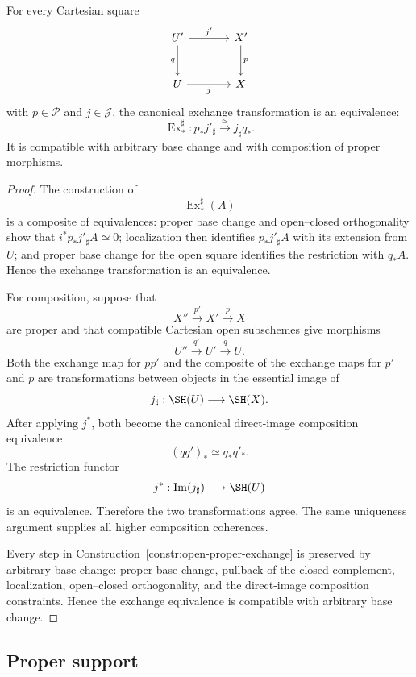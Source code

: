 \begin{theorem}
\label{thm:open-proper-exchange}
For every Cartesian square
\[
\begin{tikzcd}[column sep=large,row sep=large]
    U' \arrow[r,"j'"] \arrow[d,"q"']
        & X' \arrow[d,"p"] \\
    U \arrow[r,"j"']
        & X
\end{tikzcd}
\]
with \(p\in\mathcal P\) and \(j\in\mathcal J\), the canonical exchange
transformation is an equivalence:
\[
    \operatorname{Ex}^{\sharp}_{*}:
    p_*j'_\sharp
    \xrightarrow{\simeq}
    j_\sharp q_*.
\]
It is compatible with arbitrary base change and with composition of proper
morphisms.
\end{theorem}

\begin{proof}
The construction of
\[
    \operatorname{Ex}^{\sharp}_{*}(A)
\]
is a composite of equivalences: proper base change and open--closed
orthogonality show that \(i^*p_*j'_\sharp A\simeq0\); localization then
identifies \(p_*j'_\sharp A\) with its extension from \(U\); and proper base
change for the open square identifies the restriction with \(q_*A\).
Hence the exchange transformation is an equivalence.

For composition, suppose that
\[
    X''\xrightarrow{p'}X'\xrightarrow{p}X
\]
are proper and that compatible Cartesian open subschemes give morphisms
\[
    U''\xrightarrow{q'}U'\xrightarrow{q}U.
\]
Both the exchange map for \(pp'\) and the composite of the exchange maps for
\(p'\) and \(p\) are transformations between objects in the essential image
of
\[
    j_\sharp:\SH(U)\longrightarrow\SH(X).
\]
After applying \(j^*\), both become the canonical direct-image composition
equivalence
\[
    (qq')_*
    \simeq
    q_*q'_*.
\]
The restriction functor
\[
    j^*:\operatorname{Im}(j_\sharp)\longrightarrow\SH(U)
\]
is an equivalence.  Therefore the two transformations agree.  The same
uniqueness argument supplies all higher composition coherences.

Every step in
Construction~\ref{constr:open-proper-exchange} is preserved by arbitrary
base change: proper base change, pullback of the closed complement,
localization, open--closed orthogonality, and the direct-image composition
constraints.  Hence the exchange equivalence is compatible with arbitrary
base change.
\end{proof}

\subsection{Proper support}

